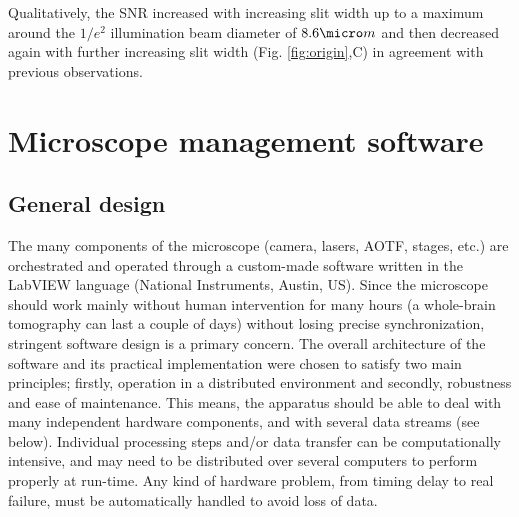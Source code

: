 \documentclass[12pt]{spieman}  %
\begin{document}
Qualitatively, the SNR increased with increasing slit width up to a maximum around the $1/e^2$ illumination beam diameter of $8.6 \micro m$ and then decreased again with further increasing slit width (Fig. \ref{fig:origin},C) in agreement with previous observations\cite{Baumgart2012}.   



\section{Microscope management software}

\subsection{General design}
The many components of the microscope (camera, lasers, AOTF, stages, etc.) are orchestrated and operated through a custom-made software written in the LabVIEW language (National Instruments, Austin, US). Since the microscope should work mainly without human intervention for many hours (a whole-brain tomography can last a couple of days) without losing precise synchronization, stringent software design is a primary concern. The overall architecture of the software and its practical implementation were chosen to satisfy two main principles; firstly, operation in a distributed environment and secondly, robustness and ease of maintenance. This means, the apparatus should be able to deal with many independent hardware components, and with several data streams (see below). Individual processing steps and/or data transfer can be computationally intensive, and may need to be distributed over several computers to perform properly at run-time. Any kind of hardware problem, from timing delay to real failure, must be automatically handled to avoid loss of data.
\end{document}
